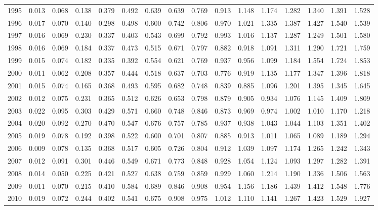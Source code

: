 \documentclass[]{article}
\begin{document}
\begin{table}[ht]
\begin{tabular}{crrrrrrrrrrrrrrr}
1995 & 0.013 & 0.068 & 0.138 & 0.379 & 0.492 & 0.639 & 0.639 & 0.769 & 0.913 & 1.148 & 1.174 & 1.282 & 1.340 & 1.391 & 1.528 \\
1996 & 0.017 & 0.070 & 0.140 & 0.298 & 0.498 & 0.600 & 0.742 & 0.806 & 0.970 & 1.021 & 1.335 & 1.387 & 1.427 & 1.540 & 1.539 \\
1997 & 0.016 & 0.069 & 0.230 & 0.337 & 0.403 & 0.543 & 0.699 & 0.792 & 0.993 & 1.016 & 1.137 & 1.287 & 1.249 & 1.501 & 1.580 \\
1998 & 0.016 & 0.069 & 0.184 & 0.337 & 0.473 & 0.515 & 0.671 & 0.797 & 0.882 & 0.918 & 1.091 & 1.311 & 1.290 & 1.721 & 1.759 \\
1999 & 0.015 & 0.074 & 0.182 & 0.335 & 0.392 & 0.554 & 0.621 & 0.769 & 0.937 & 0.956 & 1.099 & 1.184 & 1.554 & 1.724 & 1.853 \\
2000 & 0.011 & 0.062 & 0.208 & 0.357 & 0.444 & 0.518 & 0.637 & 0.703 & 0.776 & 0.919 & 1.135 & 1.177 & 1.347 & 1.396 & 1.818 \\
2001 & 0.015 & 0.074 & 0.165 & 0.368 & 0.493 & 0.595 & 0.682 & 0.748 & 0.839 & 0.885 & 1.096 & 1.201 & 1.395 & 1.345 & 1.645 \\
2002 & 0.012 & 0.075 & 0.231 & 0.365 & 0.512 & 0.626 & 0.653 & 0.798 & 0.879 & 0.905 & 0.934 & 1.076 & 1.145 & 1.409 & 1.809 \\
2003 & 0.022 & 0.095 & 0.303 & 0.429 & 0.571 & 0.660 & 0.748 & 0.846 & 0.873 & 0.969 & 0.974 & 1.002 & 1.010 & 1.170 & 1.218 \\
2004 & 0.020 & 0.092 & 0.270 & 0.470 & 0.547 & 0.676 & 0.757 & 0.785 & 0.937 & 0.938 & 1.043 & 1.044 & 1.103 & 1.351 & 1.402 \\
2005 & 0.019 & 0.078 & 0.192 & 0.398 & 0.522 & 0.600 & 0.701 & 0.807 & 0.885 & 0.913 & 1.011 & 1.065 & 1.089 & 1.189 & 1.294 \\
2006 & 0.009 & 0.078 & 0.135 & 0.368 & 0.517 & 0.605 & 0.726 & 0.804 & 0.912 & 1.039 & 1.097 & 1.174 & 1.265 & 1.242 & 1.343 \\
2007 & 0.012 & 0.091 & 0.301 & 0.446 & 0.549 & 0.671 & 0.773 & 0.848 & 0.928 & 1.054 & 1.124 & 1.093 & 1.297 & 1.282 & 1.391 \\
2008 & 0.014 & 0.050 & 0.225 & 0.421 & 0.527 & 0.638 & 0.759 & 0.859 & 0.929 & 1.060 & 1.214 & 1.190 & 1.336 & 1.506 & 1.563 \\
2009 & 0.011 & 0.070 & 0.215 & 0.410 & 0.584 & 0.689 & 0.846 & 0.908 & 0.954 & 1.156 & 1.186 & 1.439 & 1.412 & 1.548 & 1.776 \\
2010 & 0.019 & 0.072 & 0.244 & 0.402 & 0.541 & 0.675 & 0.908 & 0.975 & 1.012 & 1.110 & 1.141 & 1.267 & 1.423 & 1.529 & 1.927 \\

\end{tabular}
\end{table}
\end{document}
